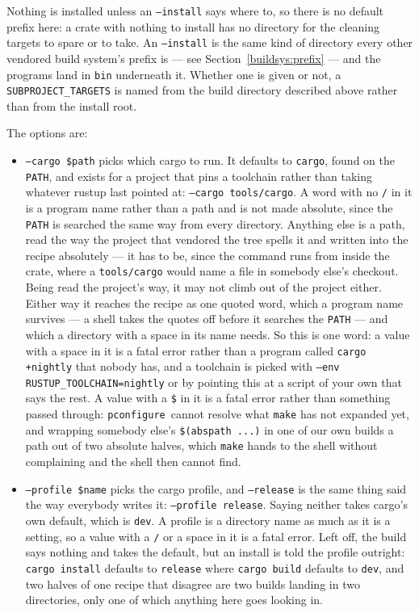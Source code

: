 \documentclass{article}
\newcommand{\pconfigure}{\texttt{pconfigure}}
\begin{document}
Nothing is installed unless an \texttt{--install} says where to, so
there is no default prefix here: a crate with nothing to install has
no directory for the cleaning targets to spare or to take.  An
\texttt{--install} is the same kind of directory every other vendored
build system's prefix is --- see Section~\ref{buildsys:prefix} ---
and the programs land in \texttt{bin} underneath it.  Whether one is
given or not, a \texttt{SUBPROJECT\_TARGETS} is named from the build
directory described above rather than from the install root.

The options are:

\begin{itemize}
\item \texttt{--cargo \$path} picks which cargo to run.  It defaults
  to \texttt{cargo}, found on the \texttt{PATH}, and exists for a
  project that pins a toolchain rather than taking whatever rustup
  last pointed at: \texttt{--cargo tools/cargo}.  A word with no
  \texttt{/} in it is a program name rather than a path and is not
  made absolute, since the \texttt{PATH} is searched the same way
  from every directory.  Anything else is a path, read the way the
  project that vendored the tree spells it and written into the recipe
  absolutely --- it has to be, since the command runs from inside the
  crate, where a \texttt{tools/cargo} would name a file in somebody
  else's checkout.  Being read the project's way, it may not climb out
  of the project either.  Either way it reaches the recipe as one
  quoted word, which a program name survives --- a shell takes the
  quotes off before it searches the \texttt{PATH} --- and which a
  directory with a space in its name needs.  So this is one word: a
  value with a space in it is a fatal error rather than a program
  called \texttt{cargo +nightly} that nobody has, and a toolchain is
  picked with \texttt{--env RUSTUP\_TOOLCHAIN=nightly} or by pointing
  this at a script of your own that says the rest.  A value with a
  \texttt{\$} in it is a fatal error rather
  than something passed through: \pconfigure\ cannot resolve what
  \texttt{make} has not expanded yet, and wrapping somebody else's
  \texttt{\$(abspath ...)} in one of our own builds a path out of two
  absolute halves, which \texttt{make} hands to the shell without
  complaining and the shell then cannot find.

\item \texttt{--profile \$name} picks the cargo profile, and
  \texttt{--release} is the same thing said the way everybody writes
  it: \texttt{--profile release}.  Saying neither takes cargo's own
  default, which is \texttt{dev}.  A profile is a directory name as
  much as it is a setting, so a value with a \texttt{/} or a space in
  it is a fatal error.  Left off, the build says nothing and takes the
  default, but an install is told the profile outright: \texttt{cargo
  install} defaults to \texttt{release} where \texttt{cargo build}
  defaults to \texttt{dev}, and two halves of one recipe that disagree
  are two builds landing in two directories, only one of which
  anything here goes looking in.


\end{itemize}
\end{document}
